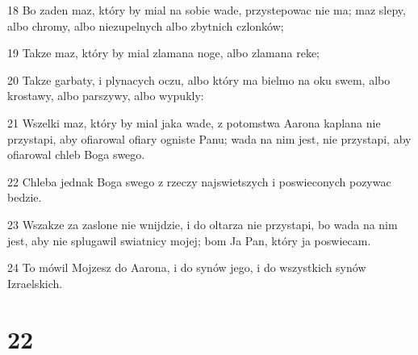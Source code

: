 \par 18 Bo zaden maz, który by mial na sobie wade, przystepowac nie ma; maz slepy, albo chromy, albo niezupelnych albo zbytnich czlonków;
\par 19 Takze maz, który by mial zlamana noge, albo zlamana reke;
\par 20 Takze garbaty, i plynacych oczu, albo który ma bielmo na oku swem, albo krostawy, albo parszywy, albo wypukly:
\par 21 Wszelki maz, który by mial jaka wade, z potomstwa Aarona kaplana nie przystapi, aby ofiarowal ofiary ogniste Panu; wada na nim jest, nie przystapi, aby ofiarowal chleb Boga swego.
\par 22 Chleba jednak Boga swego z rzeczy najswietszych i poswieconych pozywac bedzie.
\par 23 Wszakze za zaslone nie wnijdzie, i do oltarza nie przystapi, bo wada na nim jest, aby nie splugawil swiatnicy mojej; bom Ja Pan, który ja poswiecam.
\par 24 To mówil Mojzesz do Aarona, i do synów jego, i do wszystkich synów Izraelskich.

\chapter{22}

